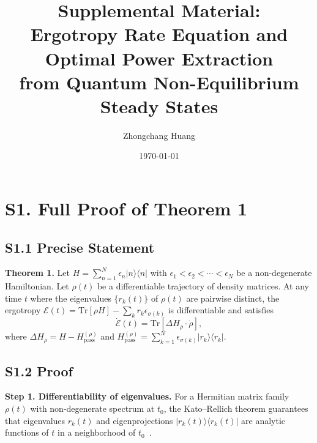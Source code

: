 \documentclass[prl,twocolumn,superscriptaddress,amsmath,amssymb]{revtex4-2}
\begin{document}
\title{Supplemental Material:\\Ergotropy Rate Equation and Optimal Power Extraction\\from Quantum Non-Equilibrium Steady States}

\author{Zhongchang Huang}

\date{\today}

\maketitle

\setcounter{equation}{0}
\setcounter{figure}{0}
\setcounter{table}{0}
\renewcommand{\theequation}{S\arabic{equation}}
\renewcommand{\thefigure}{S\arabic{figure}}

\section{S1. Full Proof of Theorem 1}

\subsection{S1.1 Precise Statement}

\textbf{Theorem 1.} Let $H = \sum_{n=1}^N \epsilon_n |n\rangle\langle n|$ with $\epsilon_1 < \epsilon_2 < \cdots < \epsilon_N$ be a non-degenerate Hamiltonian. Let $\rho(t)$ be a differentiable trajectory of density matrices. At any time $t$ where the eigenvalues $\{r_k(t)\}$ of $\rho(t)$ are pairwise distinct, the ergotropy $\mathcal{E}(t) = \mathrm{Tr}[\rho H] - \sum_k r_k \epsilon_{\sigma(k)}$ is differentiable and satisfies
\begin{equation}
\dot{\mathcal{E}}(t) = \mathrm{Tr}[\Delta H_\rho \cdot \dot\rho],
\end{equation}
where $\Delta H_\rho = H - H_{\mathrm{pass}}^{(\rho)}$ and $H_{\mathrm{pass}}^{(\rho)} = \sum_{k=1}^N \epsilon_{\sigma(k)} |r_k\rangle\langle r_k|$.

\subsection{S1.2 Proof}

\textbf{Step 1. Differentiability of eigenvalues.}
For a Hermitian matrix family $\rho(t)$ with non-degenerate spectrum at $t_0$, the Kato--Rellich theorem guarantees that eigenvalues $r_k(t)$ and eigenprojections $|r_k(t)\rangle\langle r_k(t)|$ are analytic functions of $t$ in a neighborhood of $t_0$~\cite{Kato1966}.
\end{document}
